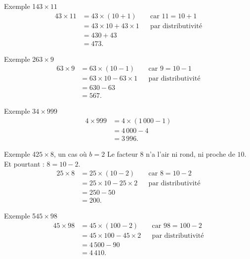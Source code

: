 \begin{exemple}{Exemple 1}{$43 \times 11$}
\begin{align*}
  43 \times 11 &= 43 \times (10 + 1)          &&\text{car } 11 = 10 + 1 \\
               &= 43 \times 10 + 43 \times 1  &&\text{par distributivité} \\
               &= 430 + 43 \\
               &= 473.
\end{align*}
\end{exemple}

\begin{exemple}{Exemple 2}{$63 \times 9$}
\begin{align*}
  63 \times 9 &= 63 \times (10 - 1)          &&\text{car } 9 = 10 - 1 \\
              &= 63 \times 10 - 63 \times 1  &&\text{par distributivité} \\
              &= 630 - 63 \\
              &= 567.
\end{align*}
\end{exemple}

\begin{exemple}{Exemple 3}{$4 \times 999$}
\begin{align*}
  4 \times 999 &= 4 \times (1\,000 - 1) \\
               &= 4\,000 - 4 \\
               &= 3\,996.
\end{align*}
\end{exemple}

\begin{exemple}{Exemple 4}{$25 \times 8$, un cas où $b = 2$}
Le facteur $8$ n'a l'air ni rond, ni proche de $10$. Et pourtant : $8 = 10 - 2$.
\begin{align*}
  25 \times 8 &= 25 \times (10 - 2)          &&\text{car } 8 = 10 - 2 \\
              &= 25 \times 10 - 25 \times 2  &&\text{par distributivité} \\
              &= 250 - 50 \\
              &= 200.
\end{align*}
\end{exemple}

\begin{exemple}{Exemple 5}{$45 \times 98$}
\begin{align*}
  45 \times 98 &= 45 \times (100 - 2)          &&\text{car } 98 = 100 - 2 \\
               &= 45 \times 100 - 45 \times 2  &&\text{par distributivité} \\
               &= 4\,500 - 90 \\
               &= 4\,410.
\end{align*}
\end{exemple}

